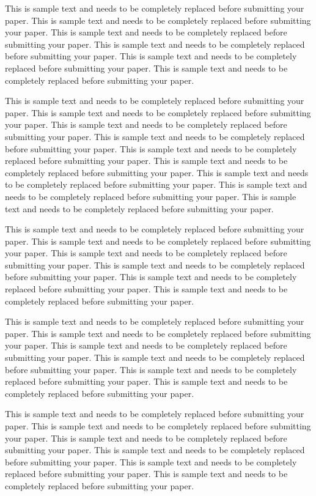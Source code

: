 \documentclass[11pt]{asaproc}
\begin{document}
This is sample text and needs to be completely replaced before submitting your paper. This is sample text and needs to be completely replaced before submitting your paper. This is sample text and needs to be completely replaced before submitting your paper. This is sample text and needs to be completely replaced before submitting your paper. This is sample text and needs to be completely replaced before submitting your paper. This is sample text and needs to be completely replaced before submitting your paper.

This is sample text and needs to be completely replaced before submitting your paper. This is sample text and needs to be completely replaced before submitting your paper. This is sample text and needs to be completely replaced before submitting your paper. This is sample text and needs to be completely replaced before submitting your paper. This is sample text and needs to be completely replaced before submitting your paper. This is sample text and needs to be completely replaced before submitting your paper. This is sample text and needs to be completely replaced before submitting your paper. This is sample text and needs to be completely replaced before submitting your paper. This is sample text and needs to be completely replaced before submitting your paper. 

This is sample text and needs to be completely replaced before submitting your paper. This is sample text and needs to be completely replaced before submitting your paper. This is sample text and needs to be completely replaced before submitting your paper. This is sample text and needs to be completely replaced before submitting your paper. This is sample text and needs to be completely replaced before submitting your paper. This is sample text and needs to be completely replaced before submitting your paper.

This is sample text and needs to be completely replaced before submitting your paper. This is sample text and needs to be completely replaced before submitting your paper. This is sample text and needs to be completely replaced before submitting your paper. This is sample text and needs to be completely replaced before submitting your paper. This is sample text and needs to be completely replaced before submitting your paper. This is sample text and needs to be completely replaced before submitting your paper.

This is sample text and needs to be completely replaced before submitting your paper. This is sample text and needs to be completely replaced before submitting your paper. This is sample text and needs to be completely replaced before submitting your paper. This is sample text and needs to be completely replaced before submitting your paper. This is sample text and needs to be completely replaced before submitting your paper. This is sample text and needs to be completely replaced before submitting your paper.
\end{document}

